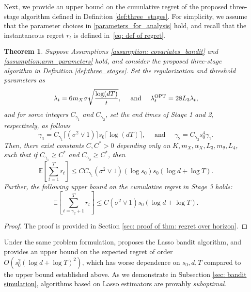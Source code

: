 \documentclass[aos,preprint]{imsart}
\theoremstyle{plain}
\newtheorem{theorem}{Theorem}
\theoremstyle{definition}
\newcommand{\hdlambda}{\lambda^{\textup{OPT}}}
\newcommand{\Exp}{\mathbb{E}}
\begin{document}
Next, we provide an upper bound on the cumulative regret of the proposed three-stage algorithm defined in Definition \ref{def:three_stages}. For simplicity, we assume that the parameter choices in \eqref{parameters_for_analysis} hold, and recall that the instantaneous regret $r_t$ is defined in~\eqref{eq: def of regret}.


\begin{theorem} \label{thm: regret over horizon}
Suppose Assumptions \ref{assumption: covariates_bandit} and  \ref{assumption:arm_parameters} hold, and consider the proposed three-stage algorithm in Definition \ref{def:three_stages}. Set the regularization and threshold parameters as
\begin{equation} \label{eq: bandit_paras_est}
\lambda_t = 6m_X\sigma\sqrt{\frac{\log (dT)}{t}},\quad \text{ and } \quad \hdlambda_t = 28L_3\lambda_t,
\end{equation}
and for some integers $C_{\gamma_1}$ and $C_{\gamma_2}$, set the end times of Stage 1 and 2, respectively, as follows
\begin{equation} \label{eq: end_times}
    \gamma_1 = C_{\gamma_1} \lceil(\sigma^2\vee 1)\rceil s_0 \lceil \log (dT) \rceil, \quad \text{ and } \quad \gamma_2 = C_{\gamma_2} s_0^4 \gamma_1.
\end{equation} 
Then, there exist constants $C,C^* > 0$ depending only on $K,  m_X, \alpha_X,  L_3, m_{\theta}, L_4$, such that if $C_{\gamma_1} \geq C^*$ and $C_{\gamma_2} \geq C^*$, then
$$
\Exp\left[\sum_{t=1}^T r_t \right] \le C C_{\gamma_1} (\sigma^2\vee 1) (\log s_0) s_0(\log d + \log T).
$$ 
Further, the following upper bound on the cumulative regret in Stage 3 holds:
$$\Exp\left[\sum_{t=\gamma_2+1}^T r_t \right] \le C (\sigma^2\vee 1) s_0(\log d + \log T).$$
\end{theorem}
\begin{proof}
The proof is provided in Section \ref{sec: proof of thm: regret over horizon}.
\end{proof}


Under the same problem formulation,   \cite{bastani2020online} proposes the Lasso bandit algorithm, and provides an upper bound on the expected regret of order $O(s_0^2(\log d+\log T)^2)$, which has worse dependence on $s_0, d, T$ compared to the upper bound established above. As we demonstrate in Subsection \ref{sec: bandit simulation}, algorithms based on Lasso estimators are provably \emph{suboptimal}.
\end{document}
